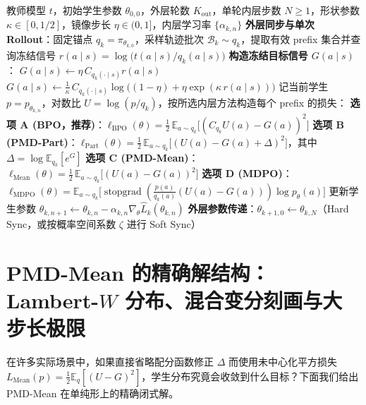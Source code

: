\documentclass[lang=cn,scheme=chinese,openany]{../book/elegantbook}
\newcommand{\E}{\mathbb E}
\newcommand{\sg}{\operatorname{stopgrad}}
\begin{document}
\begin{algorithm}[htbp]
\caption{单轨迹多步复用（Single-Rollout Multi-Step）下的 $(\kappa,\eta)$-MirrorOPD 内外层统一算法}
\label{alg:inner-four-methods}
\begin{algorithmic}[1]
\Require 教师模型 $t$，初始学生参数 $\theta_{0,0}$，外层轮数 $K_{\mathrm{out}}$，单轮内层步数 $N\ge 1$，形状参数 $\kappa\in[0,1/2]$，镜像步长 $\eta\in(0,1]$，内层学习率 $\{\alpha_{k,n}\}$
 \State \textbf{外层同步与单次 Rollout}：固定锚点 $q_k=\pi_{\theta_{k,0}}$，采样轨迹批次 $\mathcal B_k\sim q_k$，提取有效 prefix 集合并查询冻结信号 $r(a\mid s)=\log\bigl(t(a\mid s)/q_k(a\mid s)\bigr)$
 \State \textbf{构造冻结目标信号 $G(a\mid s)$}：
  \State $G(a\mid s) \gets \eta\,C_{q_k(\cdot\mid s)} r(a\mid s)$
 \Else
  \State $G(a\mid s) \gets \frac{1}{\kappa}\,C_{q_k(\cdot\mid s)}\log\bigl((1-\eta)+\eta\exp(\kappa\,r(a\mid s))\bigr)$ 
 \EndIf
  
  \State 记当前学生 $p=p_{\theta_{k,n}}$，对数比 $U=\log(p/q_k)$，按所选内层方法构造每个 prefix 的损失：
  \State \quad \textbf{选项 A (BPO，推荐)}：$\ell_{\mathrm{BPO}}(\theta)=\frac12\,\E_{a\sim q_k}\bigl[(C_{q_k} U(a)-G(a))^2\bigr]$
  \State \quad \textbf{选项 B (PMD-Part)}：$\ell_{\mathrm{Part}}(\theta)=\frac12\,\E_{a\sim q_k}\bigl[(U(a)-G(a)+\Delta)^2\bigr]$，其中 $\Delta=\log\E_{q_k}[e^G]$
  \State \quad \textbf{选项 C (PMD-Mean)}：$\ell_{\mathrm{Mean}}(\theta)=\frac12\,\E_{a\sim q_k}\bigl[(U(a)-G(a))^2\bigr]$
  \State \quad \textbf{选项 D (MDPO)}：$\ell_{\mathrm{MDPO}}(\theta)=\E_{a\sim q_k}\bigl[\sg(\tfrac{p(a)}{q_k(a)}(U(a)-G(a)))\log p_\theta(a)\bigr]$
  \State 更新学生参数 $\theta_{k,n+1}\gets \theta_{k,n}-\alpha_{k,n}\nabla_\theta \widehat L_k(\theta_{k,n})$
 \EndFor
 \State \textbf{外层参数传递}：$\theta_{k+1,0}\gets \theta_{k,N}$（Hard Sync，或按概率空间系数 $\zeta$ 进行 Soft Sync）
\EndFor
\end{algorithmic}
\end{algorithm}

\section{PMD-Mean 的精确解结构：Lambert-\texorpdfstring{$W$}{W} 分布、混合变分刻画与大步长极限}
\label{sec:pmd-mean-analysis}

在许多实际场景中，如果直接省略配分函数修正 $\Delta$ 而使用未中心化平方损失 $L_{\mathrm{Mean}}(p)=\frac12\E_q[(U-G)^2]$，学生分布究竟会收敛到什么目标？下面我们给出 PMD-Mean 在单纯形上的精确闭式解。
\end{document}
